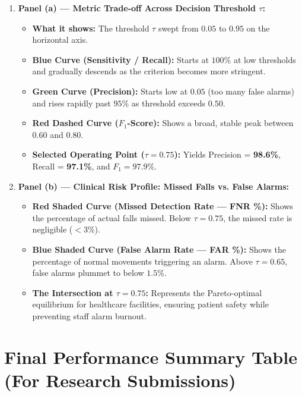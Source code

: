 \documentclass[11pt,a4paper]{article}
\begin{document}
\begin{enumerate}
    \item \textbf{Panel (a) --- Metric Trade-off Across Decision Threshold $\tau$:}
    \begin{itemize}
        \item \textbf{What it shows:} The threshold $\tau$ swept from $0.05$ to $0.95$ on the horizontal axis.
        \item \textbf{Blue Curve (Sensitivity / Recall):} Starts at $100\%$ at low thresholds and gradually descends as the criterion becomes more stringent.
        \item \textbf{Green Curve (Precision):} Starts low at $0.05$ (too many false alarms) and rises rapidly past $95\%$ as threshold exceeds $0.50$.
        \item \textbf{Red Dashed Curve ($F_1$-Score):} Shows a broad, stable peak between $0.60$ and $0.80$.
        \item \textbf{Selected Operating Point ($\tau = 0.75$):} Yields Precision = \textbf{98.6\%}, Recall = \textbf{97.1\%}, and $F_1 = \mathbf{97.9\%}$.
    \end{itemize}

    \item \textbf{Panel (b) --- Clinical Risk Profile: Missed Falls vs. False Alarms:}
    \begin{itemize}
        \item \textbf{Red Shaded Curve (Missed Detection Rate --- FNR \%):} Shows the percentage of actual falls missed. Below $\tau = 0.75$, the missed rate is negligible ($<3\%$).
        \item \textbf{Blue Shaded Curve (False Alarm Rate --- FAR \%):} Shows the percentage of normal movements triggering an alarm. Above $\tau = 0.65$, false alarms plummet to below $1.5\%$.
        \item \textbf{The Intersection at $\tau = 0.75$:} Represents the Pareto-optimal equilibrium for healthcare facilities, ensuring patient safety while preventing staff alarm burnout.
    \end{itemize}
\end{enumerate}

\vspace{0.4cm}

\section{Final Performance Summary Table (For Research Submissions)}
\end{document}
